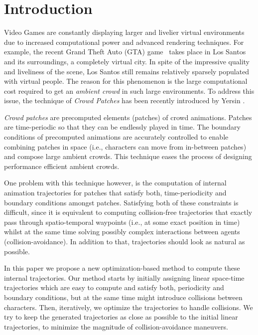 \section{Introduction}
\label{sec:intro}

Video Games are constantly displaying larger and livelier virtual environments due to increased computational power and advanced rendering techniques.
For example, the recent Grand Theft Auto (GTA) game~\cite{GTA:web} takes place in Los Santos and its surroundings, a completely virtual city.
In spite of the impressive quality and liveliness of the scene, Los Santos still remains relatively sparsely populated with virtual people.
The reason for this phenomenon is the large computational cost required to get an {\it ambient crowd} in such large environments.
To address this issue, the technique of {\it Crowd Patches} has been recently introduced by Yersin \etal \cite{Yersin:2009}.

{\it Crowd patches} are precomputed elements (patches) of crowd animations.
Patches are time-periodic so that they can be endlessly played in time.
The boundary conditions of precomputed animations are accurately controlled to enable combining patches in space (i.e., characters can move from in-between patches) and compose large ambient crowds.
This technique eases the process of designing performance efficient ambient crowds. 

One problem with this technique however, is the computation of internal animation trajectories for patches that satisfy both, time-periodicity and boundary conditions amongst patches.
Satisfying both of these constraints is difficult, since it is equivalent to computing collision-free trajectories that exactly pass through spatio-temporal waypoints (i.e., at some exact position in time) whilst at the same time solving possibly complex interactions between agents (collision-avoidance).
In addition to that, trajectories should look as natural as possible.

In this paper we propose a new optimization-based method to compute these internal trajectories.
Our method starts by initially assigning linear space-time trajectories which are easy to compute and satisfy both, periodicity and boundary conditions, but at the same time might introduce collisions between characters.
Then, iteratively, we optimize the trajectories to handle collisions.
We try to keep the generated trajectories as close as possible to the initial linear trajectories, to minimize the magnitude of collision-avoidance maneuvers.

